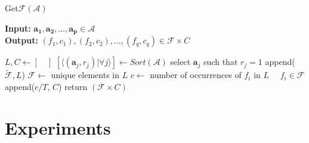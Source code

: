 \documentclass[conference]{IEEEtran}
\newcommand{\p}[1]{{\color{blue} Pdj: #1}}
\begin{document}
\begin{algorithm}
	\caption{ Get$\mathcal{F}$$(\mathcal{A})$ }
	\label{alg:f}
	\hspace*{\algorithmicindent} \textbf{Input: } $ \mathbf{a_1},\mathbf{a_2} ,\dots, \mathbf{a_p}\in \mathcal{A}$ \\
	\hspace*{\algorithmicindent} \textbf{Output: } $ (f_1,c_1), (f_2, c_2), \dots, (f_q,c_q) \in \mathcal{F} \times C  $
	\begin{algorithmic}[1] 
		\State $L, C \leftarrow [ \quad ]$ 
		\State $[\langle (\mathbf{a}_j, r_j) | \forall j \rangle ] \leftarrow Sort(\mathcal{A})$ 
		\State select $\mathbf{a}_j$ such that $r_j = 1$
		\State append($\tilde{\mathcal{F}}, L $)
		\EndFor
		\State $\mathcal{F} \leftarrow $ unique elements in $L$ 
		\State $c \leftarrow$ number of occurrences of $f_i$ in $L$ $\quad f_i \in \mathcal{F}$
		\State append($c/T$, $C$)
		\EndFor
		\State return $(\mathcal{F} \times C)$
              \end{algorithmic}
\end{algorithm}

\section{Experiments}
\label{sec:exp}
\end{document}
